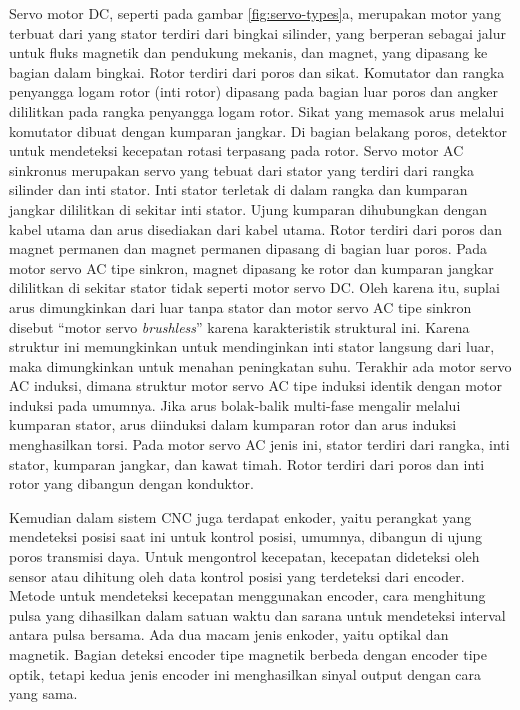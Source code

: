 Servo motor DC, seperti pada gambar \ref{fig:servo-types}a, merupakan motor yang terbuat dari yang stator terdiri dari bingkai silinder, yang berperan sebagai jalur untuk fluks magnetik dan pendukung mekanis, dan magnet, yang dipasang ke bagian dalam bingkai. Rotor terdiri dari poros dan sikat. Komutator dan rangka penyangga logam rotor (inti rotor) dipasang pada bagian luar poros dan angker dililitkan pada rangka penyangga logam rotor. Sikat yang memasok arus melalui komutator dibuat dengan kumparan jangkar. Di bagian belakang poros, detektor untuk mendeteksi kecepatan rotasi terpasang pada rotor. Servo motor AC sinkronus merupakan servo yang tebuat dari stator yang terdiri dari rangka silinder dan inti stator. Inti stator terletak di dalam rangka dan kumparan jangkar dililitkan di sekitar inti stator. Ujung kumparan dihubungkan dengan kabel utama dan arus disediakan dari kabel utama. Rotor terdiri dari poros dan magnet permanen dan magnet permanen dipasang di bagian luar poros. Pada motor servo AC tipe sinkron, magnet dipasang ke rotor dan kumparan jangkar dililitkan di sekitar stator tidak seperti motor servo DC. Oleh karena itu, suplai arus dimungkinkan dari luar tanpa stator dan motor servo AC tipe sinkron disebut “motor servo \textit{brushless}” karena karakteristik struktural ini. Karena struktur ini memungkinkan untuk mendinginkan inti stator langsung dari luar, maka dimungkinkan untuk menahan peningkatan suhu. Terakhir ada motor servo AC induksi, dimana struktur motor servo AC tipe induksi identik dengan motor induksi pada umumnya. Jika arus bolak-balik multi-fase mengalir melalui kumparan stator, arus diinduksi dalam kumparan rotor dan arus induksi menghasilkan torsi. Pada motor servo AC jenis ini, stator terdiri dari rangka, inti stator, kumparan jangkar, dan kawat timah. Rotor terdiri dari poros dan inti rotor yang dibangun dengan konduktor.

Kemudian dalam sistem CNC juga terdapat enkoder, yaitu perangkat yang mendeteksi posisi saat ini untuk kontrol posisi, umumnya, dibangun di ujung poros transmisi daya. Untuk mengontrol kecepatan, kecepatan dideteksi oleh sensor atau dihitung oleh data kontrol posisi yang terdeteksi dari encoder. Metode untuk mendeteksi kecepatan menggunakan encoder, cara menghitung pulsa yang dihasilkan dalam satuan waktu dan sarana untuk mendeteksi interval antara pulsa bersama. Ada dua macam jenis enkoder, yaitu optikal dan magnetik. Bagian deteksi encoder tipe magnetik berbeda dengan encoder tipe optik, tetapi kedua jenis encoder ini menghasilkan sinyal output dengan cara yang sama.

